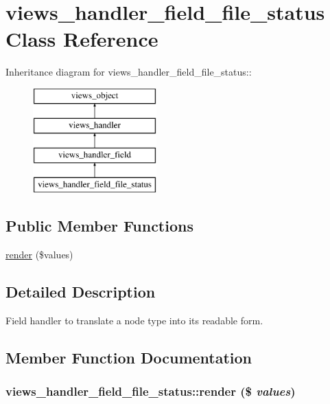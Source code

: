 \hypertarget{classviews__handler__field__file__status}{
\section{views\_\-handler\_\-field\_\-file\_\-status Class Reference}
\label{classviews__handler__field__file__status}
}
Inheritance diagram for views\_\-handler\_\-field\_\-file\_\-status::\begin{figure}[H]
\begin{center}
\leavevmode
\includegraphics[height=4cm]{classviews__handler__field__file__status}
\end{center}
\end{figure}
\subsection*{Public Member Functions}
\begin{CompactItemize}
\item 
\hyperlink{classviews__handler__field__file__status_ead1c1405c8a5ecdede4a455ed4d6015}{render} (\$values)
\end{CompactItemize}


\subsection{Detailed Description}
Field handler to translate a node type into its readable form. 

\subsection{Member Function Documentation}
\hypertarget{classviews__handler__field__file__status_ead1c1405c8a5ecdede4a455ed4d6015}{
\subsubsection[{render}]{\setlength{\rightskip}{0pt plus 5cm}views\_\-handler\_\-field\_\-file\_\-status::render (\$ {\em values})}}
\label{classviews__handler__field__file__status_ead1c1405c8a5ecdede4a455ed4d6015}


